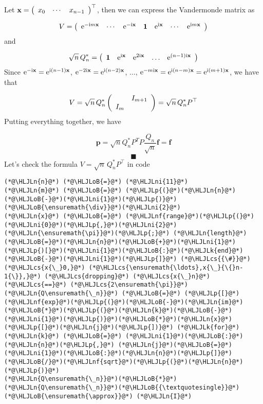 \documentclass[12pt,landscape]{article}
\newcommand{\HLJLk}[1]{\textcolor[RGB]{148,91,176}{\textbf{#1}}}
\newcommand{\HLJLn}[1]{#1}
\newcommand{\HLJLnf}[1]{\textcolor[RGB]{66,102,213}{#1}}
\newcommand{\HLJLni}[1]{\textcolor[RGB]{59,151,46}{#1}}
\newcommand{\HLJLoB}[1]{\textcolor[RGB]{102,102,102}{\textbf{#1}}}
\newcommand{\HLJLp}[1]{#1}
\newcommand{\HLJLcs}[1]{\textcolor[RGB]{153,153,119}{\textit{#1}}}
\begin{document}
{Let $\mathbf{x} = \left(\begin{array}{c c c} x_0 & \cdots & x_{n-1}  \end{array}\right)^{\top}$, then we can express the Vandermonde matrix as

\[
V = 
\left(
\begin{array}{c c c c c c c}
{\rm e}^{-{\rm i}m\mathbf{x}}  & \cdots & {\rm e}^{-{\rm i}\mathbf{x}} &\mathbf{1}  & {\rm e}^{{\rm i}\mathbf{x}} & \cdots & {\rm e}^{{\rm i}m\mathbf{x}}
\end{array}
\right)
\]
and

\[
\sqrt{n}\,Q_n^* = \left(
\begin{array}{c c c c c}
\mathbf{1}  & {\rm e}^{{\rm i}\mathbf{x}} & {\rm e}^{2{\rm i}\mathbf{x}} & \ldots & {\rm e}^{(n-1){\rm i}\mathbf{x}}
\end{array}
\right)
\]
Since ${\rm e}^{-{\rm i}\mathbf{x}} = {\rm e}^{{\rm i}(n-1)\mathbf{x}}$, ${\rm e}^{-2{\rm i}\mathbf{x}} = {\rm e}^{{\rm i}(n-2)\mathbf{x}}$, $\dots$, ${\rm e}^{-m{\rm i}\mathbf{x}} = {\rm e}^{{\rm i}(n-m)\mathbf{x}} = {\rm e}^{{\rm i}(m+1)\mathbf{x}}$, we have that

\[
V = \sqrt{n}\,Q_n^*\left(
\begin{array}{c c}
 & I_{m+1} \\
I_m &
\end{array}
\right) =  \sqrt{n}\,Q_n^* P^{\top}
\]
Putting everything together, we have

\[
\mathbf{p} = \sqrt{n}Q_n^* P^{T} P \frac{Q_n}{\sqrt{n}}\mathbf{f} = \mathbf{f}
\]
\[
\blacksquare
\]
\newpage
Let's check the formula $V = \sqrt{n}\,Q_n^* P^{\top}$ in code


\begin{lstlisting}
(*@\HLJLn{n}@*) (*@\HLJLoB{=}@*) (*@\HLJLni{11}@*)
(*@\HLJLn{m}@*) (*@\HLJLoB{=}@*) (*@\HLJLp{(}@*)(*@\HLJLn{n}@*)(*@\HLJLoB{-}@*)(*@\HLJLni{1}@*)(*@\HLJLp{)}@*)(*@\HLJLoB{\ensuremath{\div}}@*)(*@\HLJLni{2}@*)
(*@\HLJLn{x}@*) (*@\HLJLoB{=}@*) (*@\HLJLnf{range}@*)(*@\HLJLp{(}@*)(*@\HLJLni{0}@*)(*@\HLJLp{,}@*)(*@\HLJLni{2}@*)(*@\HLJLn{\ensuremath{\pi}}@*)(*@\HLJLp{;}@*) (*@\HLJLn{length}@*)(*@\HLJLoB{=}@*)(*@\HLJLn{n}@*)(*@\HLJLoB{+}@*)(*@\HLJLni{1}@*)(*@\HLJLp{)[}@*)(*@\HLJLni{1}@*)(*@\HLJLoB{:}@*)(*@\HLJLk{end}@*)(*@\HLJLoB{-}@*)(*@\HLJLni{1}@*)(*@\HLJLp{]}@*) (*@\HLJLcs{{\#}}@*) (*@\HLJLcs{x{\_}0,}@*) (*@\HLJLcs{\ensuremath{\ldots},x{\_}{\{}n-1{\}},}@*) (*@\HLJLcs{dropping}@*) (*@\HLJLcs{x{\_}n}@*) (*@\HLJLcs{==}@*) (*@\HLJLcs{2\ensuremath{\pi}}@*)
(*@\HLJLn{Q\ensuremath{\_n}}@*) (*@\HLJLoB{=}@*) (*@\HLJLp{[}@*)(*@\HLJLnf{exp}@*)(*@\HLJLp{(}@*)(*@\HLJLoB{-}@*)(*@\HLJLn{im}@*)(*@\HLJLoB{*}@*)(*@\HLJLp{(}@*)(*@\HLJLn{k}@*)(*@\HLJLoB{-}@*)(*@\HLJLni{1}@*)(*@\HLJLp{)}@*)(*@\HLJLoB{*}@*)(*@\HLJLn{x}@*)(*@\HLJLp{[}@*)(*@\HLJLn{j}@*)(*@\HLJLp{])}@*) (*@\HLJLk{for}@*) (*@\HLJLn{k}@*) (*@\HLJLoB{=}@*) (*@\HLJLni{1}@*)(*@\HLJLoB{:}@*)(*@\HLJLn{n}@*)(*@\HLJLp{,}@*) (*@\HLJLn{j}@*)(*@\HLJLoB{=}@*)(*@\HLJLni{1}@*)(*@\HLJLoB{:}@*)(*@\HLJLn{n}@*)(*@\HLJLp{]}@*)(*@\HLJLoB{/}@*)(*@\HLJLnf{sqrt}@*)(*@\HLJLp{(}@*)(*@\HLJLn{n}@*)(*@\HLJLp{)}@*)
(*@\HLJLn{Q\ensuremath{\_n}}@*)(*@\HLJLoB{*}@*)(*@\HLJLn{Q\ensuremath{\_n}}@*)(*@\HLJLoB{{\textquotesingle}}@*) (*@\HLJLoB{\ensuremath{\approx}}@*) (*@\HLJLn{I}@*)
\end{lstlisting}

}
\end{document}
